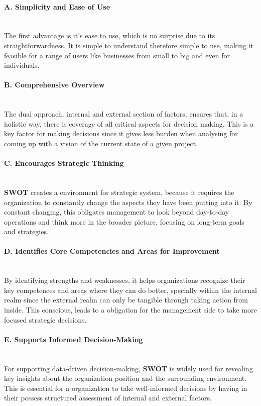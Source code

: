 \paragraph{A. Simplicity and Ease of Use}\mbox{}\\
The first advantage is it's ease to use, which is no surprise due to its straightforwardness. It is simple to understand therefore simple to use, making it feasible for a range of users like businesses from small to big and even for individuals.

\paragraph{B. Comprehensive Overview }\mbox{}\\
The dual approach, internal and external section of factors,  ensures that, in a holistic way, there is coverage of all critical aspects for decision making. This is a key factor for making decisions since it gives less burden when analysing for coming up with a vision of the current state of a given project.

\paragraph{C. Encourages Strategic Thinking}\mbox{}\\
\textbf{SWOT} creates a environment for strategic system, because it requires the organization to constantly change the aspects they have been putting into it. By constant changing, this obligates management to look beyond day-to-day operations and think more in the broader picture, focusing on long-term goals and strategies.

\paragraph{D. Identifies Core Competencies and Areas for Improvement}\mbox{}\\
By identifying strengths and weaknesses, it helps organizations recognize their key competences and areas where they can do better, specially within the internal realm since the external realm can only be tangible through taking action from inside. This conscious, leads to a obligation for the management side to take more focused strategic decisions.

\paragraph{E. Supports Informed Decision-Making}\mbox{}\\
For supporting data-driven decision-making, \textbf{SWOT} is widely used for revealing key insights about the organization position and the surrounding environment. This is essential for a organization to take well-informed decisions by having in their possess structured assessment of internal and external factors.


